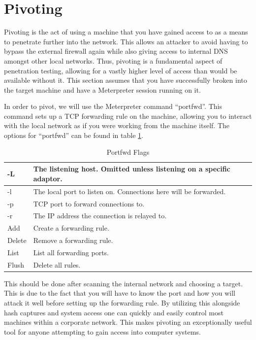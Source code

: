 \documentclass[a4paper,11pt]{report}
\begin{document}
	\section{Pivoting}
		Pivoting is the act of using a machine that you have gained access to as a means to penetrate further into the network. 
		This allows an attacker to avoid having to bypass the external firewall again while also giving access to internal DNS amongst other local networks. 
		Thus, pivoting is a fundamental aspect of penetration testing, allowing for a vastly higher level of access than would be available without it. 
		This section assumes that you have successfully broken into the target machine and have a Meterpreter session running on it. 
	
		In order to pivot, we will use the Meterpreter command ``portfwd''.
		This command sets up a TCP forwarding rule on the machine, allowing you to interact with the local network as if you were working from the machine itself. 
		The options for ``portfwd'' can be found in table \ref{tab:portfwdFlags}.
		\begin{table}[htb]
			\centering
			\begin{tabular}{| l | l |}
				\hline
				-L & The listening host. Omitted unless listening on a specific adaptor.\\ \hline 
				-l & The local port to listen on. Connections here will be forwarded. \\ \hline
				-p & TCP port to forward connections to. \\ \hline
				-r & The IP address the connection is relayed to. \\ \hline
				Add & Create a forwarding rule. \\ \hline
				Delete & Remove a forwarding rule. \\ \hline
				List & List all forwarding ports. \\ \hline
				Flush & Delete all rules. \\ \hline
			\end{tabular}
			\caption{Portfwd Flags}
			\label{tab:portfwdFlags}
		\end{table}
		This should be done after scanning the internal network and choosing a target. 
		This is due to the fact that you will have to know the port and how you will attack it well before setting up the forwarding rule. 
		By utilizing this alongside hash captures and system access one can quickly and easily control most machines within a corporate network. 
		This makes pivoting an exceptionally useful tool for anyone attempting to gain access into computer systems. 
\end{document}
